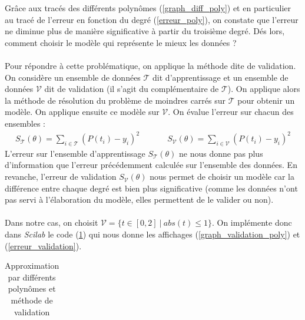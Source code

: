 \documentclass[a4paper,10pt]{report}
\begin{document}
Grâce aux tracés des différents polynômes (\ref{graph_diff_poly}) et en particulier au tracé de l'erreur en fonction du degré (\ref{erreur_poly}), on constate que l'erreur ne diminue plus de manière significative à partir du troisième degré. Dés lors, comment choisir le modèle qui représente le mieux les données ?\\ \\
\indent Pour répondre à cette problématique, on applique la méthode dite de validation. On considère un ensemble de données $\mathcal{T}$ dit d'apprentissage et un ensemble de données $\mathcal{V}$ dit de validation (il s'agit du complémentaire de $\mathcal{T}$). On applique alors la méthode de résolution du problème de moindres carrés sur $\mathcal{T}$ pour obtenir un modèle. On applique ensuite ce modèle sur $\mathcal{V}$. On évalue l'erreur sur chacun des ensembles :\\
\begin{displaymath}
\begin{array}{ccc}
S_{\mathcal{T}}(\theta)=\sum \limits_{i \in \mathcal{T}}(P(t_i)-y_i)^2 & \ \ \ \ \ \ \ \ & S_{\mathcal{V}}(\theta)=\sum \limits_{i \in \mathcal{V}}(P(t_i)-y_i)^2
\end{array}
\end{displaymath}
L'erreur sur l'ensemble d'apprentissage $S_{\mathcal{T}}(\theta)$ ne nous donne pas plus d'information que l'erreur précédemment calculée sur l'ensemble des données. En revanche, l'erreur de validation $S_{\mathcal{V}}(\theta)$ nous permet de choisir un modèle car la différence entre chaque degré est bien plus significative (comme les données n'ont pas servi à l'élaboration du modèle, elles permettent de le valider ou non).\\ \\
\indent Dans notre cas, on choisit $\mathcal{V}=\{ t \in [0,2] \ | \ abs(t)\leq 1 \}$. On implémente donc dans \textit{Scilab} le code (\ref{code_validation}) qui nous donne les affichages (\ref{graph_validation_poly}) et (\ref{erreur_validation}).

\begin{table}[H]
\caption{Approximation par différents polynômes et méthode de validation}
\begin{tabular}{l}

\label{code_validation}
\end{tabular}
\end{table}
\end{document}
